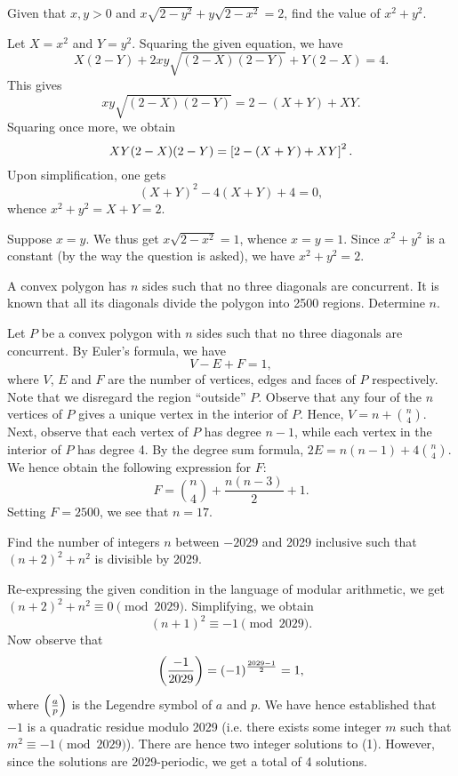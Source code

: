 \begin{question}[2]\label{A::2024-O-1-15}
    Given that $x, y > 0$ and $x\sqrt{2-y^2} + y\sqrt{2-x^2} = 2$, find the value of $x^2 + y^2$.
\end{question}
\begin{solution}
    Let $X = x^2$ and $Y = y^2$. Squaring the given equation, we have \[X(2-Y) + 2xy\sqrt{(2-X)(2-Y)} + Y(2-X) = 4.\] This gives \[xy\sqrt{(2-X)(2-Y)} = 2 - (X+Y) + XY.\]Squaring once more, we obtain \[XY(2-X)(2-Y) = \left[ 2 - (X+Y) + XY \right]^2.\] Upon simplification, one gets \[(X+Y)^2 - 4(X+Y) + 4 = 0,\] whence $x^2 + y^2 = X + Y = 2$.
\end{solution}
\begin{solution}
    Suppose $x = y$. We thus get $x\sqrt{2- x^2} = 1$, whence $x = y = 1$. Since $x^2 + y^2$ is a constant (by the way the question is asked), we have $x^2 + y^2 = 2$.
\end{solution}

\begin{question}[17]\label{A::2024-O-1-16}
    A convex polygon has $n$ sides such that no three diagonals are concurrent. It is known that all its diagonals divide the polygon into 2500 regions. Determine $n$.
\end{question}
\begin{solution*}
    Let $P$ be a convex polygon with $n$ sides such that no three diagonals are concurrent. By Euler's formula, we have \[V - E + F = 1,\] where $V$, $E$ and $F$ are the number of vertices, edges and faces of $P$ respectively. Note that we disregard the region ``outside'' $P$. Observe that any four of the $n$ vertices of $P$ gives a unique vertex in the interior of $P$. Hence, $V = n + \binom{n}{4}$. Next, observe that each vertex of $P$ has degree $n-1$, while each vertex in the interior of $P$ has degree 4. By the degree sum formula, $2E = n(n-1) + 4\binom{n}{4}$. We hence obtain the following expression for $F$: \[F = \binom{n}{4} + \frac{n(n-3)}2 + 1.\] Setting $F = 2500$, we see that $n = 17$.
\end{solution*}

\begin{question}[4]\label{A::2024-O-1-17}
    Find the number of integers $n$ between $-2029$ and 2029 inclusive such that $(n+2)^2 + n^2$ is divisible by 2029.
\end{question}
\begin{solution*}
    Re-expressing the given condition in the language of modular arithmetic, we get $(n+2)^2 + n^2 \equiv 0 \pmod{2029}$. Simplifying, we obtain \[(n+1)^2 \equiv -1 \pmod{2029}.\tag{1}\] Now observe that \[\left( \frac{-1}{2029} \right) = (-1)^{\frac{2029-1}{2}} = 1,\] where $\left( \frac{a}{p} \right)$ is the Legendre symbol of $a$ and $p$. We have hence established that $-1$ is a quadratic residue modulo 2029 (i.e. there exists some integer $m$ such that $m^2 \equiv -1 \pmod{2029}$). There are hence two integer solutions to (1). However, since the solutions are 2029-periodic, we get a total of 4 solutions.
\end{solution*}

